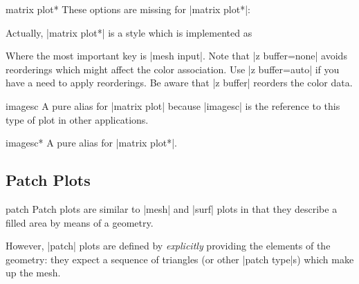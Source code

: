 {\begin{plottype}{matrix plot*}
    These options are missing for |matrix plot*|:
\begin{codeexample}[]
\end{codeexample}
    Actually, |matrix plot*| is a style which is implemented as
\begin{codeexample}
\end{codeexample}
    Where the most important key is |mesh input|. Note that
    |z buffer=none| avoids reorderings which might affect the color
    association. Use |z buffer=auto| if you have a need to apply reorderings.
    Be aware that |z buffer| reorders the color data.
\end{plottype}

\begin{plottype}{imagesc}
    A pure alias for |matrix plot| because |imagesc| is the reference to this
    type of plot in other applications.
\end{plottype}

\begin{plottype}{imagesc*}
    A pure alias for |matrix plot*|.
\end{plottype}


\subsection{Patch Plots}
\label{sec:pgfplots:3d:patch}

\begin{plottype}[/pgfplots]{patch}
    Patch plots are similar to |mesh| and |surf| plots in that they describe a
    filled area by means of a geometry.

    However, |patch| plots are defined by \emph{explicitly} providing the
    elements of the geometry: they expect a sequence of triangles (or other
    |patch type|s) which make up the mesh.


\end{plottype}}
